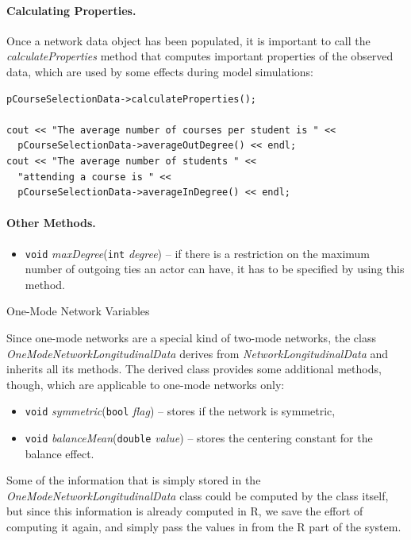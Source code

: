 \documentclass[12pt]{article}
\makeatletter
\renewcommand{\=}{\,=\,}
\newcommand{\+}{\,+\,}
\newcommand{\nnm}[1]{\textsf{\small\textit{#1}}}
\renewcommand{\subsubsection}{\@startsection{subsubsection}{3}
                {0pt}{0.7\baselineskip}{0.3\baselineskip}
                {\sffamily} }
\makeatother
\begin{document}
\paragraph{Calculating Properties.}

Once a network data object has been populated, it is important to call the
\nnm{calculateProperties} method that computes important properties of the
observed data, which are used by some effects during model simulations:
\begin{verbatim}
pCourseSelectionData->calculateProperties();

cout << "The average number of courses per student is " <<
  pCourseSelectionData->averageOutDegree() << endl;
cout << "The average number of students " <<
  "attending a course is " <<
  pCourseSelectionData->averageInDegree() << endl;
\end{verbatim}

\paragraph{Other Methods.}
\begin{itemize}
\item \verb|void| \nnm{maxDegree}(\verb|int| \nnm{degree}) -- if there is a
restriction on the maximum number of outgoing ties an actor can have, it has
to be specified by using this method.
\end{itemize}

\subsubsection{One-Mode Network Variables}

Since one-mode networks are a special kind of two-mode networks, the class
\nnm{OneModeNetworkLongitudinalData} derives from \nnm{NetworkLongitudinalData}
and inherits all its methods. The derived class provides some additional
methods, though, which are applicable to one-mode networks only:
\begin{itemize}
\item \verb|void| \nnm{symmetric}(\verb|bool| \nnm{flag}) -- stores if the
network is symmetric,
\item \verb|void| \nnm{balanceMean}(\verb|double| \nnm{value}) -- stores the
centering constant for the balance effect.
\end{itemize}
Some of the information that is simply stored in the
\nnm{OneModeNetworkLongitudinalData} class could be computed by the class
itself, but since this information is already computed in R, we save the effort
of computing it again, and simply pass the values in from the R part of the
system.
\end{document}
